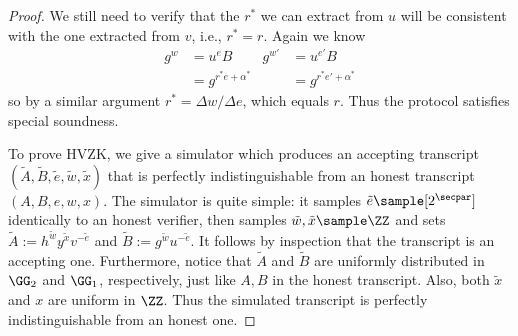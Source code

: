 \begin{proof}
    We still need to verify that the $r^*$ we can extract from $u$ will be consistent with the one extracted from $v$, i.e., $r^* = r$. Again we know
    \begin{align*}
             g^w &= u^e B            & g^{w'} &= u^{e'} B \\
                 &= g^{r^* e + \alpha^*} &    &= g^{r^* e' + \alpha^*}
    \end{align*}
    so by a similar argument $r^* = \Delta w/\Delta e$, which equals $r$.
    Thus the protocol satisfies special soundness.
    
    To prove HVZK, we give a simulator which produces an accepting transcript $(\tilde{A}, \tilde{B}, \tilde{e}, \tilde{w}, \tilde{x})$ that is perfectly indistinguishable from an honest transcript $(A, B, e, w, x)$. The simulator is quite simple: it samples $\tilde{e} \sample [2^\secpar]$ identically to an honest verifier, then samples $\tilde{w}, \tilde{x} \sample \ZZ$ and sets $\tilde{A} := h^{\tilde{w}} y^{\tilde{x}} v^{-\tilde{e}}$ and $\tilde{B} := g^{\tilde{w}} u^{-\tilde{e}}$. It follows by inspection that the transcript is an accepting one. Furthermore, notice that $\tilde{A}$ and $\tilde{B}$ are uniformly distributed in $\GG_2$ and $\GG_1$, respectively, just like $A, B$ in the honest transcript. Also, both $\tilde{x}$ and $x$ are uniform in $\ZZ$. Thus the simulated transcript is perfectly indistinguishable from an honest one.
\end{proof}


    
